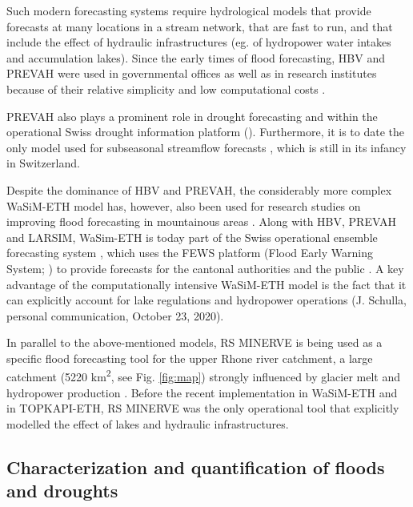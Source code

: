\documentclass[10pt,a4paper]{article}
\begin{document}
Such modern forecasting systems require hydrological models that provide
forecasts at many locations in a stream network, that are fast to run,
and that include the effect of hydraulic infrastructures (eg. of
hydropower water intakes and accumulation lakes). Since the early times
of flood forecasting, HBV and PREVAH were used in governmental offices
\citep{Karsten2016} as well as in research institutes because of their
relative simplicity and low computational costs \citep{Verbunt2006,Addor_2011,Murphy_2019,Antonetti2019}.

PREVAH also plays a prominent role in drought
forecasting \citep{Fundel2013,J_rg_Hess_2015,Bogner2018b} and within the operational Swiss drought
information platform (\citealp{Stahli2013}). Furthermore, it is to date
the only model used for subseasonal streamflow
forecasts \citep{Monhart_2019,Anghileri2019}, which is still in its infancy in
Switzerland.

Despite the dominance of HBV and PREVAH, the considerably more complex
WaSiM-ETH model has, however, also been used for research studies on
improving flood forecasting in mountainous areas \citep{Jasper2003,Ahrens2003b,Jasper2002}.
Along with HBV, PREVAH and LARSIM, WaSim-ETH is today part of the Swiss
operational ensemble forecasting system \citep{Karsten2016}, which uses
the FEWS platform (Flood Early Warning System; \citealp{Werner_2013}) to
provide forecasts for the cantonal authorities and the
public \citep{FOEN2019}. A key advantage of the computationally
intensive WaSiM-ETH model is the fact that it can explicitly account for
lake regulations and hydropower operations (J. Schulla, personal
communication, October 23, 2020). 

In parallel to the above-mentioned models, RS MINERVE is being used as a
specific flood forecasting tool for the upper Rhone river catchment, a
large catchment (5220 km\textsuperscript{2}, see
Fig. \ref{fig:map}) strongly influenced by glacier
melt and hydropower production \citep{GarciaHernandez2009b,GarciaHernandez2009,Jordan2010}. Before the recent
implementation in WaSiM-ETH and in TOPKAPI-ETH, RS MINERVE was the only
operational tool that explicitly modelled the effect of lakes and
hydraulic infrastructures.

\subsection{Characterization and quantification of floods and droughts}
\label{sec:application:floodsdroughts}
\end{document}
